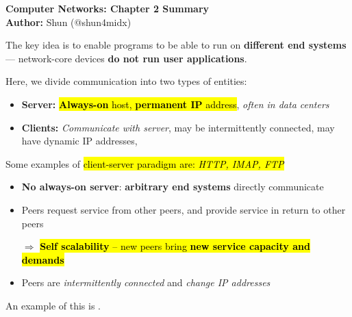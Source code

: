 \documentclass[12pt,a4paper]{article}
\begin{document}
\begin{center}
  {\Large \bf Computer Networks: Chapter 2 Summary}\\[8pt]
  \textbf{Author:} Shun (@shun4midx)
\end{center}


\noindent The key idea is to enable programs to be able to run on \textbf{different end systems} --- network-core devices \textbf{do not run user applications}. \\


\noindent Here, we divide communication into two types of entities:

\vspace{0.5em}\begin{itemize}
  \item \textbf{Server:} \hl{\textbf{Always-on} host, \textbf{permanent IP} address}, \textit{often in data centers}
  \item \textbf{Clients:} \textit{Communicate with server}, may be intermittently connected, may have dynamic IP addresses, 
\end{itemize}

\noindent Some examples of \hl{client-server paradigm are: \textit{HTTP, IMAP, FTP}} \\


\begin{itemize}
  \item \textbf{No always-on server}: \textbf{arbitrary end systems} directly communicate
  \item Peers request service from other peers, and provide service in return to other peers

  $\Rightarrow$ \hl{\textbf{Self scalability} -- new peers bring \textbf{new service capacity and demands}}

  \item Peers are \textit{intermittently connected} and \textit{change IP addresses}
\end{itemize}

\noindent An example of this is . \\

\end{document}
